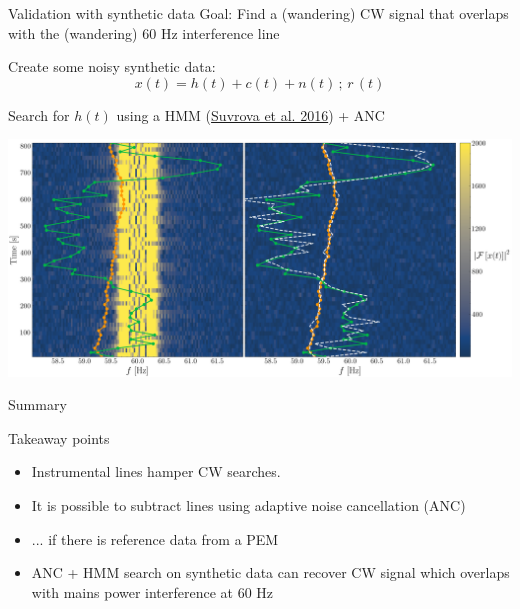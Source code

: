 \documentclass[10pt]{beamer}
\begin{document}
\begin{frame}{Validation with synthetic data}
	\alert{Goal}: Find a (wandering) CW signal that overlaps with the (wandering) 60 Hz interference line 
	
	
	Create some noisy synthetic data:
	$$x(t) = h(t) + c(t) + n(t) \, ; \,  r\,(t)$$
	

	Search for $h(t)$ using a HMM (\href{https://arxiv.org/abs/1606.02412}{Suvrova et al. 2016}) + ANC

\end{frame}



\begin{frame}
	
	\centering
			\includegraphics[width=1\textwidth,height=0.48\textwidth]{images/viterbi_tracking_canonical}
	
	

	
\end{frame}






	\begin{frame}{Summary}
	
	\begin{block}{\alert{Takeaway points}}
		\begin{itemize}
			\item Instrumental lines hamper CW searches.
			\item It is possible to subtract lines using adaptive noise cancellation (ANC) 
			\item ... if there is reference data from a PEM
			\item ANC + HMM search on synthetic data can recover CW signal which overlaps with mains power interference at 60 Hz
		\end{itemize}
	\end{block}
	
\end{frame}
\end{document}
